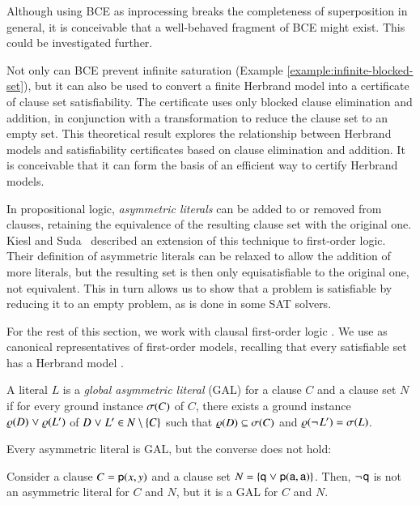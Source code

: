 Although using BCE as inprocessing breaks the completeness of superposition in
general, it is conceivable that a well-behaved fragment of BCE might exist.
This could be investigated further.

   
Not only can BCE prevent infinite saturation (Example \ref{example:infinite-blocked-set}),
but it can also be used to convert a finite Herbrand model
into a certificate of clause set satisfiability. The certificate uses only
blocked clause elimination and addition, in conjunction with a transformation
to reduce the clause set to an empty set. This theoretical result
explores the relationship between Herbrand models and satisfiability certificates
based on clause elimination and addition. It is conceivable that it can form
the basis of an efficient way to certify Herbrand models.


In propositional logic, \emph{asymmetric literals} can be added to
or removed from clauses, retaining the equivalence of the resulting clause set with
the original one. Kiesl and Suda~\cite{ks-2017-unif-principle} described an extension of
this technique to first-order logic.
Their definition of asymmetric literals can be relaxed to
allow the addition of more literals, but the resulting set is then only
equisatisfiable to the original one, not equivalent.
This in turn allows us to show that a problem is satisfiable by
reducing it to an empty problem, as is done in some SAT solvers.

For the rest of this section, we work with clausal first-order logic
. We use  as canonical
representatives of first-order models, recalling that every
satisfiable set has a Herbrand model \cite[Sect.~5.4]{mf-1996-fol}.

\begin{defi}
   A literal $L$ is a \emph{global asymmetric literal} (GAL) for a clause $C$
   and a clause set $N$ if for every ground instance $\sigma(C)$ of $C$, there
   exists a ground instance $\varrho(D) \mathrel{\lor} \varrho(L')$ of $D \mathrel{\lor} L' \in N \setminus \{C\}$ such that $\varrho(D)
   \subseteq \sigma(C)$ and $\varrho(\neg{\kern.2ex L}') = \sigma(L)$.
 \end{defi}
\confrep{}{}

Every asymmetric literal is GAL, but the converse does not hold:

\begin{exa}
   Consider a clause $C = {\mathsf{p}(x,y)}$ and a clause set $N = \{{\mathsf{q}} \mathrel{\lor}
  {\mathsf{p}(\mathsf{a},\mathsf{a})}\}$. Then, $\neg{\kern.2ex \mathsf{q}}$ is not an asymmetric literal
  for $C$ and $N$, but it is a GAL for $C$ and $N$.
\end{exa}


